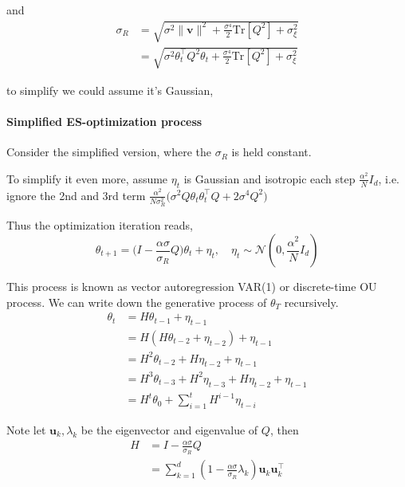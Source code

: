     and 
    \begin{align*}
    \sigma_{R} & =\sqrt{\sigma^{2}\|\mathbf{v}\|^{2}+\frac{\sigma^{4}}{2}\mathrm{Tr}[Q^{2}]+\sigma_{\xi}^{2}}\\
     & =\sqrt{\sigma^{2}\theta_{t}^{\top}Q^{2}\theta_{t}+\frac{\sigma^{4}}{2}\mathrm{Tr}[Q^{2}]+\sigma_{\xi}^{2}}
    \end{align*}
    
    to simplify we could assume it's Gaussian, 
    
    \paragraph{Simplified ES-optimization process }
    
    Consider the simplified version, where the $\sigma_{R}$ is held constant. 
    
    To simplify it even more, assume $\eta_{t}$ is Gaussian and isotropic
    each step $\frac{\alpha^{2}}{N}I_{d}$, i.e. ignore the 2nd and 3rd
    term $\frac{\alpha^{2}}{N\sigma_{R}^{2}}\Big(\sigma^{2}Q\theta_{t}\theta_{t}^{\top}Q+2\sigma^{4}Q^{2}\Big)$
    
    Thus the optimization iteration reads, 
    \[
    \theta_{t+1}=\Big(I-\frac{\alpha\sigma}{\sigma_{R}}Q\Big)\theta_{t}+\eta_{t},\quad\eta_{t}\sim\mathcal{N}(0,\frac{\alpha^{2}}{N}I_{d})
    \]
    
    This process is known as vector autoregression VAR(1) or discrete-time
    OU process. We can write down the generative process of $\theta_{T}$
    recursively. 
    \begin{align*}
    \theta_{t} & =H\theta_{t-1}+\eta_{t-1}\\
     & =H(H\theta_{t-2}+\eta_{t-2})+\eta_{t-1}\\
     & =H^{2}\theta_{t-2}+H\eta_{t-2}+\eta_{t-1}\\
     & =H^{3}\theta_{t-3}+H^{2}\eta_{t-3}+H\eta_{t-2}+\eta_{t-1}\\
     & =H^{t}\theta_{0}+\sum_{i=1}^{t}H^{i-1}\eta_{t-i}
    \end{align*}
    
    Note let $\mathbf{u}_{k},\lambda_{k}$ be the eigenvector and eigenvalue
    of $Q$, then 
    \begin{align*}
    H & =I-\frac{\alpha\sigma}{\sigma_{R}}Q\\
     & =\sum_{k=1}^{d}(1-\frac{\alpha\sigma}{\sigma_{R}}\lambda_{k})\mathbf{u}_{k}\mathbf{u}_{k}^{\top}
    \end{align*}
     
